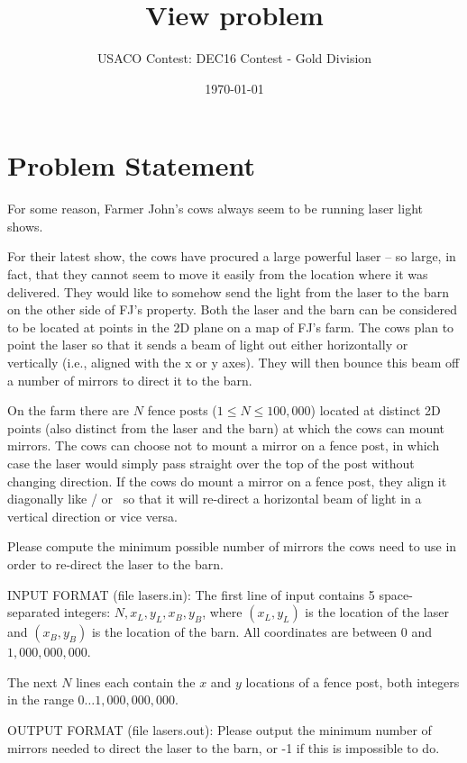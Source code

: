 \documentclass[12pt]{article}
\title{View problem}
\author{USACO Contest: DEC16 Contest - Gold Division}
\date{\today}
\begin{document}
\maketitle

\section*{Problem Statement}

For some reason, Farmer John's cows always seem to be running laser light shows.

For their latest show, the cows have procured a large powerful laser -- so large,
in fact, that they cannot seem to move it easily from the location where it was
delivered. They would like to somehow send the light from the laser to the barn
on the other side of FJ's property.  Both the laser and the barn can be
considered to be located at points in the 2D plane on a map of FJ's farm.  The
cows plan to point the laser so that it sends a beam of light out either
horizontally or vertically (i.e.,  aligned with the x or y axes).  They will
then bounce this beam off a number of mirrors to direct it to the barn.

On the farm there are $N$ fence posts ($1 \leq N \leq 100,000$) located at
distinct 2D points (also distinct from the laser and the barn) at which the cows
can mount mirrors.  The cows can choose not to mount a mirror on a fence post,
in which case the laser would simply pass straight over the top of the post
without changing direction.  If the cows do mount a mirror on a fence post, they
align it diagonally like / or \ so that it will re-direct a horizontal beam of
light in a vertical direction or vice versa.

Please compute the minimum possible number of mirrors the cows need to use in
order to re-direct the laser to the barn.

INPUT FORMAT (file lasers.in):
The first line of input contains 5 space-separated integers:
$N, x_L, y_L, x_B, y_B$, where $(x_L, y_L)$ is the location of the laser and
$(x_B, y_B)$ is the location of the barn.  All coordinates are between $0$ and
$1,000,000,000$.

The next $N$ lines each contain the $x$ and $y$ locations of a fence post, both
integers in the range
$0 \ldots 1,000,000,000$.

OUTPUT FORMAT (file lasers.out):
Please output the minimum number of mirrors needed to direct the laser to the
barn, or -1 if this is impossible to do.
\end{document}
